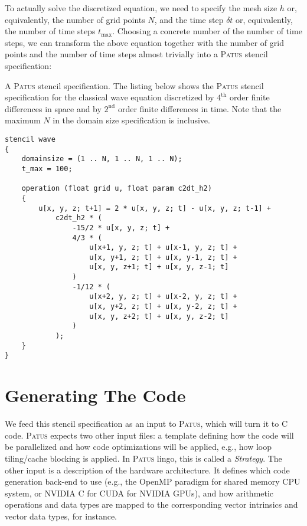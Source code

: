 To actually solve the discretized equation, we need to specify the mesh size $h$ or, equivalently, the number of grid points $N$,
and the time step $\delta t$ or, equivalently, the number of time steps $t_{\text{max}}$.
Choosing a concrete number of the number of time steps, we can transform the above equation together with the
number of grid points and the number of time steps almost trivially into a \textsc{Patus} stencil specification:

\begin{example}{A \textsc{Patus} stencil specification.}
	The listing below shows the \textsc{Patus} stencil specification for the classical wave
	equation discretized by $4^{\text{th}}$ order finite differences in space and by
	$2^{\text{nd}}$ order finite differences in time. Note that the maximum $N$ in the domain
	size specification is inclusive.

\begin{lstlisting}[language=stencil, frame={}]
stencil wave
{
    domainsize = (1 .. N, 1 .. N, 1 .. N);
    t_max = 100;

    operation (float grid u, float param c2dt_h2)
    {
        u[x, y, z; t+1] = 2 * u[x, y, z; t] - u[x, y, z; t-1] +
            c2dt_h2 * (
                -15/2 * u[x, y, z; t] +
                4/3 * (
                    u[x+1, y, z; t] + u[x-1, y, z; t] +
                    u[x, y+1, z; t] + u[x, y-1, z; t] +
                    u[x, y, z+1; t] + u[x, y, z-1; t]
                )
                -1/12 * (
                    u[x+2, y, z; t] + u[x-2, y, z; t] +
                    u[x, y+2, z; t] + u[x, y-2, z; t] +
                    u[x, y, z+2; t] + u[x, y, z-2; t]
                )
            );
    }
}
\end{lstlisting}
\end{example}


\section{Generating The Code}

We feed this stencil specification as an input to \textsc{Patus}, which will turn it to C code.
\textsc{Patus} expects two other input files: a template defining how the code will be parallelized
and how code optimizations will be applied, e.g., how loop tiling/cache blocking is applied.
In \textsc{Patus} lingo, this is called a {\em Strategy}. The other input is a description of the
hardware architecture. It defines which code generation back-end to use (e.g., the OpenMP paradigm
for shared memory CPU system, or NVIDIA C for CUDA for NVIDIA GPUs), and how arithmetic operations
and data types are mapped to the corresponding vector intrinsics and vector data types, for instance.

